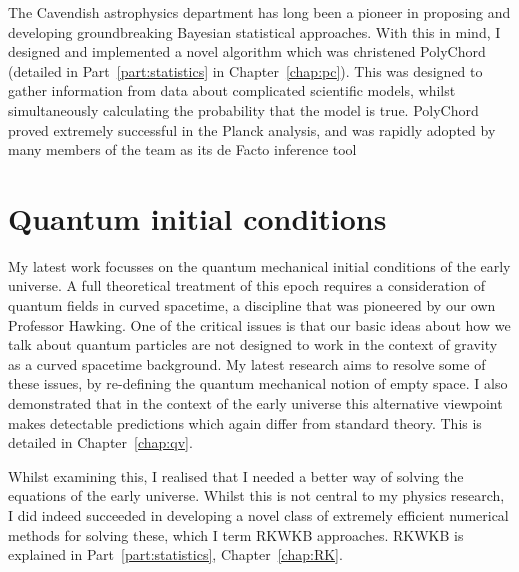 The Cavendish astrophysics department has long been a pioneer in proposing and developing groundbreaking Bayesian statistical approaches. With this in mind, I designed and implemented a novel algorithm which was christened PolyChord (detailed in Part~\ref{part:statistics} in Chapter~\ref{chap:pc}). This was designed to gather information from data about complicated scientific models, whilst simultaneously calculating the probability that the model is true. PolyChord proved extremely successful in the Planck analysis, and was rapidly adopted by many members of the team as its de Facto inference tool

\section{Quantum initial conditions}
My latest work focusses on the quantum mechanical initial conditions of the early universe. A full theoretical treatment of this epoch requires a consideration of quantum fields in curved spacetime, a discipline that was pioneered by our own Professor Hawking. One of the critical issues is that our basic ideas about how we talk about quantum particles are not designed to work in the context of gravity as a curved spacetime background. My latest research aims to resolve some of these issues, by re-defining the quantum mechanical notion of empty space. I also demonstrated that in the context of the early universe this alternative viewpoint makes detectable predictions which again differ from standard theory. This is detailed in Chapter~\ref{chap:qv}.

Whilst examining this, I realised that I needed a better way of solving the equations of the early universe. Whilst this is not central to my physics research, I did indeed succeeded in developing a novel class of extremely efficient numerical methods for solving these, which I term RKWKB approaches. RKWKB is explained in Part~\ref{part:statistics}, Chapter~\ref{chap:RK}.




